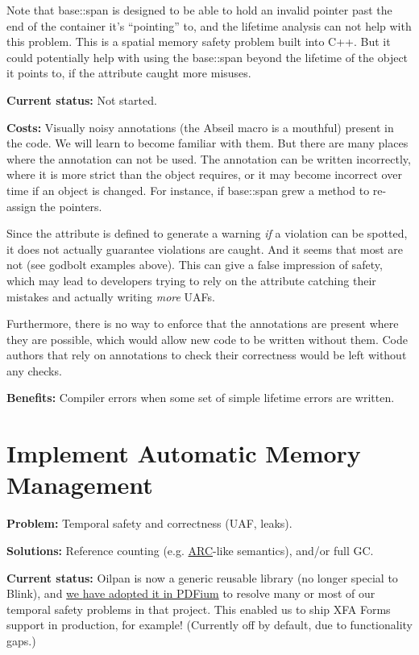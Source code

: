 \documentclass[a4paper,12pt,notitlepage,twoside,openright]{article}
\begin{document}
Note that base::span is designed to be able to hold an invalid pointer
past the end of the container it's ``pointing'' to, and the lifetime
analysis can not help with this problem. This is a spatial memory safety
problem built into C++. But it could potentially help with using
the base::span beyond the lifetime of the object it points to, if the
attribute caught more misuses.

\textbf{Current status:} Not started.

\textbf{Costs:} Visually noisy annotations (the Abseil macro is a
mouthful) present in the code. We will learn to become familiar with
them. But there are many places where the annotation can not be used.
The annotation can be written incorrectly, where it is more strict than
the object requires, or it may become incorrect over time if an object
is changed. For instance, if base::span grew a method to re-assign the
pointers.

Since the attribute is defined to generate a warning \emph{if} a
violation can be spotted, it does not actually guarantee violations are
caught. And it seems that most are not (see godbolt examples above).
This can give a false impression of safety, which may lead to developers
trying to rely on the attribute catching their mistakes and actually
writing \emph{more }UAFs.

Furthermore, there is no way to enforce that the annotations are present
where they are possible, which would allow new code to be written
without them. Code authors that rely on annotations to check their
correctness would be left without any checks.

\textbf{Benefits:} Compiler errors when some set of simple lifetime
errors are written.

\section{Implement Automatic Memory Management}

\textbf{Problem:} Temporal safety and correctness (UAF, leaks).

\textbf{Solutions:} Reference counting
(e.g. \href{https://www.google.com/url?q=https://en.wikipedia.org/wiki/Automatic_Reference_Counting\&sa=D\&source=editors\&ust=1631944129042000\&usg=AOvVaw0oMAe91IrprtUI2zFzkmi7}{ARC}-like
semantics), and/or full GC.

\textbf{Current status:} Oilpan is now a generic reusable library (no
longer special to Blink),
and \href{https://www.google.com/url?q=https://bugs.chromium.org/p/pdfium/issues/detail?id\%3D1563\&sa=D\&source=editors\&ust=1631944129042000\&usg=AOvVaw1uctKa94n_u0n9AU7jui4R}{we }\href{https://www.google.com/url?q=https://bugs.chromium.org/p/pdfium/issues/detail?id\%3D1563\&sa=D\&source=editors\&ust=1631944129043000\&usg=AOvVaw0MGd1-LSOfDe38KK48Tt0p}{have
adopted it in PDFium} to resolve many or most of our temporal safety
problems in that project. This enabled us to ship XFA Forms support in
production, for example! (Currently off by default, due to functionality
gaps.)
\end{document}
